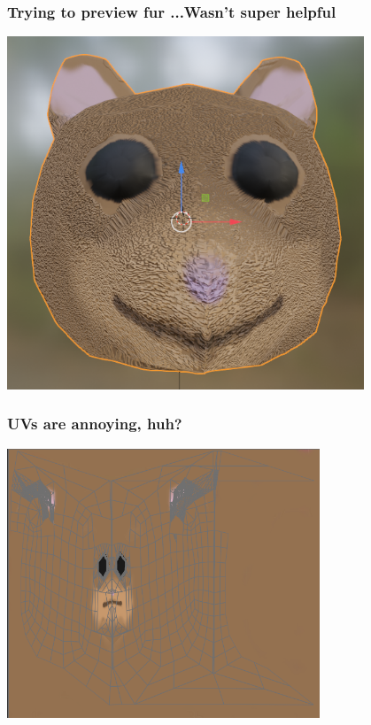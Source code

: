 \documentclass[12pt]{beamer}
\begin{document}
    \begin{frame}
        \frametitle{Trying to preview fur ...Wasn't super helpful}
        \includegraphics[width=0.8\textwidth]{roughricky}
    \end{frame}
    \begin{frame}
        \frametitle{ UVs are annoying, huh?}
        \includegraphics[width=0.7\textwidth]{UVs}
    \end{frame}
\end{document}
